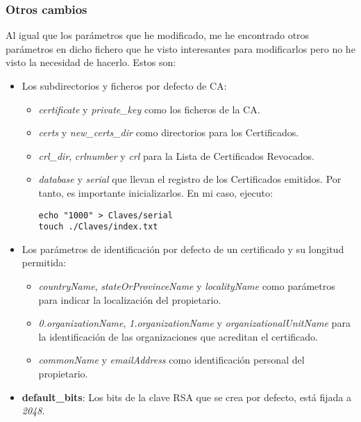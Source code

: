 \documentclass[a4paper, 11pt]{article}
\begin{document}
		\subsubsection{Otros cambios}
			Al igual que los parámetros que he modificado, me he encontrado otros parámetros en dicho fichero que he visto
			interesantes para modificarlos pero no he visto la necesidad de hacerlo. Estos son:
			\begin{itemize}
				\item Los subdirectorios y ficheros por defecto de CA:
				\begin{itemize}
					\item \textit{certificate} y \textit{private\_key} como los ficheros de la CA.
					
					\item \textit{certs} y \textit{new\_certs\_dir} como directorios para los Certificados.
					
					\item \textit{crl\_dir}, \textit{crlnumber} y \textit{crl} para la Lista de Certificados Revocados.
					
					\item \textit{database} y \textit{serial} que llevan el registro de los Certificados emitidos. Por tanto,
					es importante inicializarlos. En mi caso, ejecuto:\\
					\begin{small}
						\verb|echo "1000" > Claves/serial|\\
						\verb|touch ./Claves/index.txt|\\
					\end{small}
				\end{itemize}
				
				\item Los parámetros de identificación por defecto de un certificado y su longitud permitida:
				\begin{itemize}
					\item \textit{countryName}, \textit{stateOrProvinceName} y \textit{localityName} como parámetros para
					indicar la localización del propietario.
					
					\item \textit{0.organizationName}, \textit{1.organizationName} y \textit{organizationalUnitName} para
					la identificación de las organizaciones que acreditan el certificado.
					
					\item \textit{commonName} y \textit{emailAddress} como identificación personal del propietario.
				\end{itemize}
				
				\item \textbf{default\_bits}: Los bits de la clave RSA que se crea por defecto, está fijada a \textit{2048}.
			\end{itemize}
			
\end{document}
